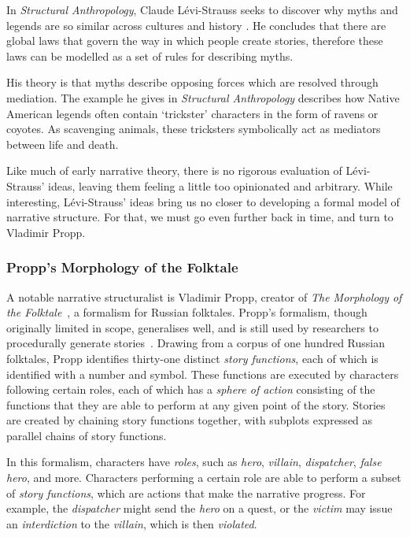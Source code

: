 In \emph{Structural Anthropology}, Claude L\'{e}vi-Strauss seeks to discover why myths and legends are so similar across cultures and history \citep{levi2008structural}. He concludes that there are global laws that govern the way in which people create stories, therefore these laws can be modelled as a set of rules for describing myths.

His theory is that myths describe opposing forces which are resolved through mediation. The example he gives in \emph{Structural Anthropology} describes how Native American legends often contain `trickster' characters in the form of ravens or coyotes. As scavenging animals, these tricksters symbolically act as mediators between life and death.

Like much of early narrative theory, there is no rigorous evaluation of L\'{e}vi-Strauss' ideas, leaving them feeling a little too opinionated and arbitrary. While interesting, L\'{e}vi-Strauss' ideas bring us no closer to developing a formal model of narrative structure. For that, we must go even further back in time, and turn to Vladimir Propp.

\subsubsection{Propp's Morphology of the Folktale}
A notable narrative structuralist is Vladimir Propp, creator of \emph{The Morphology of the Folktale}~\cite{propp1968morphology}, a formalism for Russian folktales. Propp's formalism, though originally limited in scope, generalises well, and is still used by researchers to procedurally generate stories~\cite{grasbon2001morphological,gervas2005story,hartmann2005motif}. Drawing from a corpus of one hundred Russian folktales, Propp identifies thirty-one distinct \emph{story functions}, each of which is identified with a number and symbol. These functions are executed by characters following certain roles, each of which has a \emph{sphere of action} consisting of the functions that they are able to perform at any given point of the story. Stories are created by chaining story functions together, with subplots expressed as parallel chains of story functions.

In this formalism, characters have \emph{roles}, such as \emph{hero}, \emph{villain}, \emph{dispatcher}, \emph{false hero}, and more. Characters performing a certain role are able to perform a subset of \emph{story functions}, which are actions that make the narrative progress. For example, the \emph{dispatcher} might send the \emph{hero} on a quest, or the \emph{victim} may issue an \emph{interdiction} to the \emph{villain}, which is then \emph{violated}.


